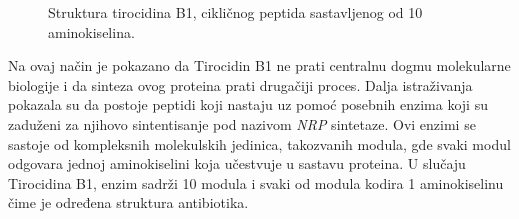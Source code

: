 \documentclass[12pt,oneside]{memoir}
\begin{document}
\begin{figure}[h]
  \centering
  
  \caption{Struktura tirocidina B1, cikličnog peptida sastavljenog od 10 aminokiselina.}
  \label{fig:tirocidin}
\end{figure}

Na ovaj način je pokazano da Tirocidin B1 ne prati centralnu dogmu molekularne biologije i da sinteza ovog proteina prati drugačiji proces. Dalja istraživanja pokazala su da postoje peptidi koji nastaju uz pomoć posebnih enzima koji su zaduženi za njihovo sintentisanje pod nazivom \emph{NRP} sintetaze. Ovi enzimi se sastoje od kompleksnih molekulskih jedinica, takozvanih modula, gde svaki modul odgovara jednoj aminokiselini koja učestvuje u sastavu proteina. U slučaju Tirocidina B1, enzim sadrži 10 modula i svaki od modula kodira 1 aminokiselinu čime je određena struktura antibiotika.
\end{document}
